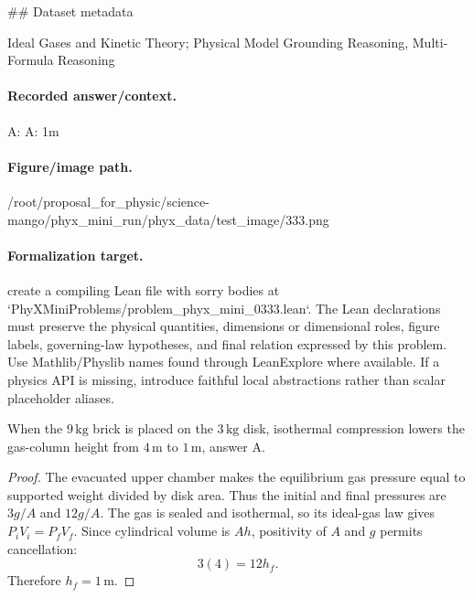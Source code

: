 \#\# Dataset metadata

Ideal Gases and Kinetic Theory; Physical Model Grounding Reasoning, Multi-Formula Reasoning

\paragraph{Recorded answer/context.}
A: A: 1m

\paragraph{Figure/image path.}
/root/proposal\_for\_physic/science-mango/phyx\_mini\_run/phyx\_data/test\_image/333.png

\paragraph{Formalization target.}
create a compiling Lean file with sorry bodies at `PhyXMiniProblems/problem\_phyx\_mini\_0333.lean`. The Lean declarations must preserve the physical quantities, dimensions or dimensional roles, figure labels, governing-law hypotheses, and final relation expressed by this problem.
Use Mathlib/Physlib names found through LeanExplore where available. If a physics API is missing, introduce faithful local abstractions rather than scalar placeholder aliases.

\begin{theorem}
\label{thm:physics:phyx_mini_0333:target}
When the \(9\,\mathrm{kg}\) brick is placed on the \(3\,\mathrm{kg}\) disk,
isothermal compression lowers the gas-column height from \(4\,\mathrm m\) to
\(1\,\mathrm m\), answer A.
\end{theorem}
\begin{proof}
The evacuated upper chamber makes the equilibrium gas pressure equal to
supported weight divided by disk area.  Thus the initial and final pressures
are \(3g/A\) and \(12g/A\).  The gas is sealed and isothermal, so its ideal-gas
law gives \(P_iV_i=P_fV_f\).  Since cylindrical volume is \(Ah\), positivity
of \(A\) and \(g\) permits cancellation:
\[
 3(4)=12h_f.
\]
Therefore \(h_f=1\,\mathrm m\).
\end{proof}

